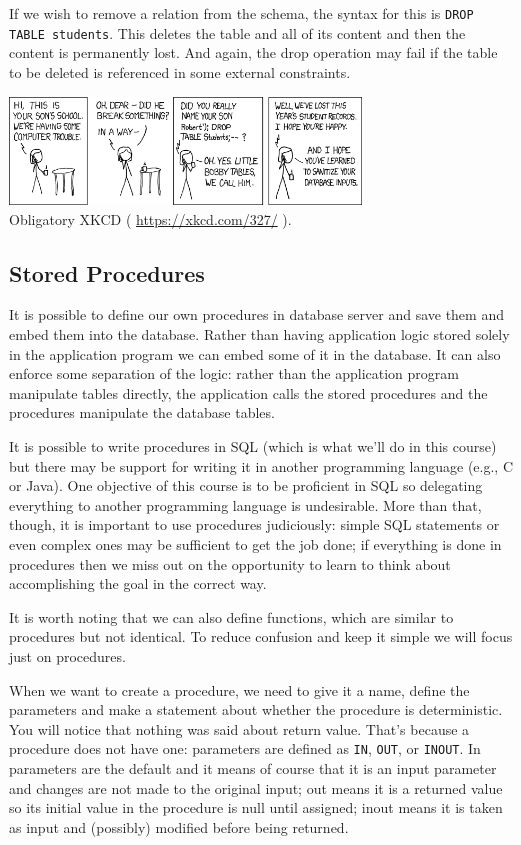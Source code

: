 If we wish to remove a relation from the schema, the syntax for this is \texttt{DROP TABLE students}. This deletes the table and all of its content and then the content is permanently lost. And again, the drop operation may fail if the table to be deleted is referenced in some external constraints.

\begin{center}
\includegraphics[width=0.7\textwidth]{images/exploits_of_a_mom}\\
Obligatory XKCD ( \url{https://xkcd.com/327/} ).
\end{center}

\subsection*{Stored Procedures}
It is possible to define our own procedures in database server and save them and embed them into the database. Rather than having application logic stored solely in the application program we can embed some of it in the database. It can also enforce some separation of the logic: rather than the application program manipulate tables directly, the application calls the stored procedures and the procedures manipulate the database tables.

It is possible to write procedures in SQL (which is what we'll do in this course) but there may be support for writing it in another programming language (e.g., C or Java). One objective of this course is to be proficient in SQL so delegating everything to another programming language is undesirable. More than that, though, it is important to use procedures judiciously: simple SQL statements or even complex ones may be sufficient to get the job done; if everything is done in procedures then we miss out on the opportunity to learn to think about accomplishing the goal in the correct way. 

It is worth noting that we can also define functions, which are similar to procedures but not identical. To reduce confusion and keep it simple we will focus just on procedures. 

When we want to create a procedure, we need to give it a name, define the parameters and make a statement about whether the procedure is deterministic. You will notice that nothing was said about return value. That's because a procedure does not have one: parameters are defined as \texttt{IN}, \texttt{OUT}, or \texttt{INOUT}. In parameters are the default and it means of course that it is an input parameter and changes are not made to the original input; out means it is a returned value so its initial value in the procedure is null until assigned; inout means it is taken as input and (possibly) modified before being returned.



